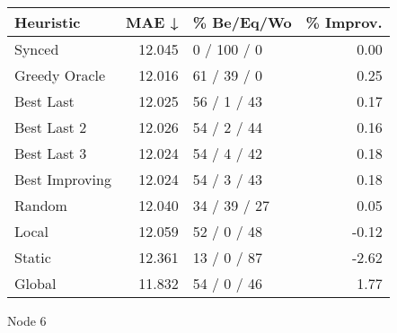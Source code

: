 \begin{tabular}{lrlr}
\toprule
\textbf{Heuristic} & \textbf{MAE ↓} & \textbf{\% Be/Eq/Wo} & \textbf{\% Improv.} \\
\midrule
            Synced &         12.045 &          0 / 100 / 0 &                0.00 \\
     Greedy Oracle &         12.016 &          61 / 39 / 0 &                0.25 \\
         Best Last &         12.025 &          56 / 1 / 43 &                0.17 \\
       Best Last 2 &         12.026 &          54 / 2 / 44 &                0.16 \\
       Best Last 3 &         12.024 &          54 / 4 / 42 &                0.18 \\
    Best Improving &         12.024 &          54 / 3 / 43 &                0.18 \\
            Random &         12.040 &         34 / 39 / 27 &                0.05 \\
             Local &         12.059 &          52 / 0 / 48 &               -0.12 \\
            Static &         12.361 &          13 / 0 / 87 &               -2.62 \\
            Global &         11.832 &          54 / 0 / 46 &                1.77 \\
\bottomrule
\end{tabular}
\caption{Node 6}
\label{tab:ds_iid_lr01_le1_bs4_6}
